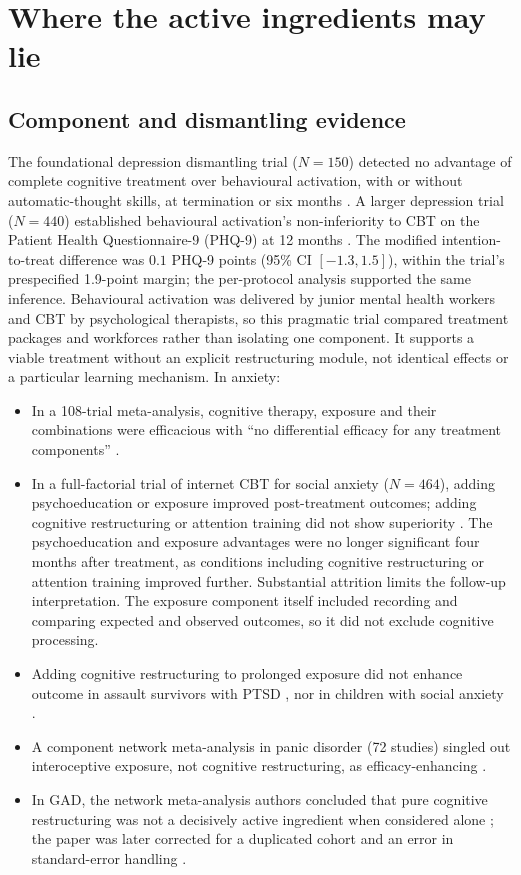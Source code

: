 \section{Where the active ingredients may lie}\label{sec:ingredients}
\subsection{Component and dismantling evidence}
The foundational depression dismantling trial ($N=150$) detected no advantage of complete cognitive treatment over behavioural activation, with or without automatic-thought skills, at termination or six months \citep{jacobson1996component}.
A larger depression trial ($N=440$) established behavioural activation's non-inferiority to CBT on the Patient Health Questionnaire-9 (PHQ-9) at 12 months \citep{richards2016cobra}.
The modified intention-to-treat difference was $0.1$ PHQ-9 points (95\% CI $[-1.3,1.5]$), within the trial's prespecified 1.9-point margin; the per-protocol analysis supported the same inference.
Behavioural activation was delivered by junior mental health workers and CBT by psychological therapists, so this pragmatic trial compared treatment packages and workforces rather than isolating one component.
It supports a viable treatment without an explicit restructuring module, not identical effects or a particular learning mechanism.
In anxiety:
\begin{itemize}
\item In a 108-trial meta-analysis, cognitive therapy, exposure and their combinations were efficacious with ``no differential efficacy for any treatment components'' \citep{norton2007metaanalytic}.
\item In a full-factorial trial of internet CBT for social anxiety ($N=464$), adding psychoeducation or exposure improved post-treatment outcomes; adding cognitive restructuring or attention training did not show superiority \citep{sipka2025factorial}.
The psychoeducation and exposure advantages were no longer significant four months after treatment, as conditions including cognitive restructuring or attention training improved further.
Substantial attrition limits the follow-up interpretation.
The exposure component itself included recording and comparing expected and observed outcomes, so it did not exclude cognitive processing.
\item Adding cognitive restructuring to prolonged exposure did not enhance outcome in assault survivors with PTSD \citep{foa2005pecr}, nor in children with social anxiety \citep{demooij2023social}.
\item A component network meta-analysis in panic disorder (72 studies) singled out interoceptive exposure, not cognitive restructuring, as efficacy-enhancing \citep{pompoli2018dismantling}.
\item In GAD, the network meta-analysis authors concluded that pure cognitive restructuring was not a decisively active ingredient when considered alone \citep{papola2024gad}; the paper was later corrected for a duplicated cohort and an error in standard-error handling \citep{papola2024correction}.
\end{itemize}

